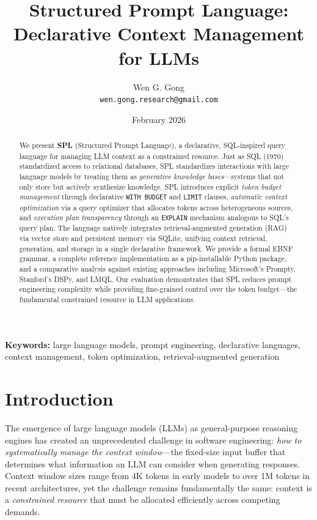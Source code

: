 \documentclass[11pt,a4paper]{article}
\title{%
  \textbf{Structured Prompt Language:\\
  Declarative Context Management for LLMs}
}
\author{
  Wen G. Gong\\
  \small \texttt{wen.gong.research@gmail.com}
}
\date{February 2026}
\begin{document}
\maketitle

\begin{abstract}

We present \textbf{SPL} (Structured Prompt Language), a declarative, SQL-inspired query language for managing LLM context as a constrained resource. Just as SQL (1970) standardized access to relational databases, SPL standardizes interactions with large language models by treating them as \emph{generative knowledge bases}---systems that not only store but actively synthesize knowledge. SPL introduces explicit \emph{token budget management} through declarative \texttt{WITH BUDGET} and \texttt{LIMIT} clauses, \emph{automatic context optimization} via a query optimizer that allocates tokens across heterogeneous sources, and \emph{execution plan transparency} through an \texttt{EXPLAIN} mechanism analogous to SQL's query plan. The language natively integrates retrieval-augmented generation (RAG) via vector store and persistent memory via SQLite, unifying context retrieval, generation, and storage in a single declarative framework. We provide a formal EBNF grammar, a complete reference implementation as a pip-installable Python package, and a comparative analysis against existing approaches including Microsoft's Prompty, Stanford's DSPy, and LMQL. Our evaluation demonstrates that SPL reduces prompt engineering complexity while providing fine-grained control over the token budget---the fundamental constrained resource in LLM applications.

\end{abstract}

\textbf{Keywords:} large language models, prompt engineering, declarative languages, context management, token optimization, retrieval-augmented generation

\section{Introduction}
\label{sec:intro}

The emergence of large language models (LLMs) as general-purpose reasoning engines has created an unprecedented challenge in software engineering: \emph{how to systematically manage the context window}---the fixed-size input buffer that determines what information an LLM can consider when generating responses. Context window sizes range from 4K tokens in early models to over 1M tokens in recent architectures, yet the challenge remains fundamentally the same: context is a \emph{constrained resource} that must be allocated efficiently across competing demands.
\end{document}

